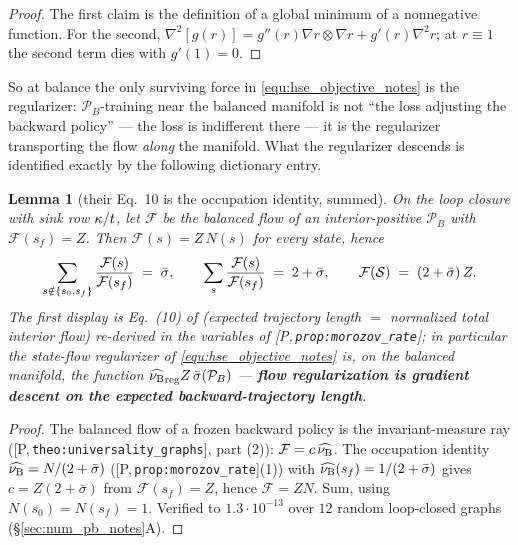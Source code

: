 \documentclass[11pt]{article}
\newtheorem{lemma}[theorem]{Lemma}
\theoremstyle{definition}
\theoremstyle{remark}
\def\lambda{\widehat\nuB}
\newcommand{\paperref}[1]{[P,\,\texttt{#1}]}   %
\begin{document}
\begin{proof}
The first claim is the definition of a global minimum of a nonnegative function. For the
second, $\nabla^2[g(r)] = g''(r)\nabla r\otimes\nabla r + g'(r)\nabla^2 r$; at $r\equiv1$
the second term dies with $g'(1)=0$.
\end{proof}

So at balance the only surviving force in \eqref{equ:hse_objective_notes} is the regularizer:
$\mathcal P_B$-training near the balanced manifold is not ``the loss adjusting the
backward policy'' --- the loss is indifferent there --- it is the regularizer
transporting the flow \emph{along} the manifold. What the regularizer descends is
identified exactly by the following dictionary entry.

\begin{lemma}[their Eq.~10 is the occupation identity, summed]\label{lem:eq10_occupation_notes}
On the loop closure with sink row $\kappa/t$, let $\mathcal F$ be the balanced flow of an
interior-positive $\mathcal P_B$ with $\mathcal F(s_f)=Z$. Then $\mathcal F(s) = Z\,N(s)$
for every state, hence
\begin{equation}\label{equ:eq10_notes}
    \sum_{s\notin\{s_0,s_f\}}\frac{\mathcal F(s)}{\mathcal F(s_f)} \;=\; \bar\sigma,
    \qquad
    \sum_{s}\frac{\mathcal F(s)}{\mathcal F(s_f)} \;=\; 2+\bar\sigma,
    \qquad
    \mathcal F(\mathcal S) \;=\; (2+\bar\sigma)\,Z .
\end{equation}
The first display is Eq.~(10) of \citet{morozov2025revisiting} (expected trajectory
length $=$ normalized total interior flow) re-derived in the variables of
\paperref{prop:morozov\_rate}; in particular the state-flow regularizer of
\eqref{equ:hse_objective_notes} is, on the balanced manifold, the function
$\lamreg{}Z\,\bar\sigma(\mathcal P_B)$ --- \textbf{flow regularization is
gradient descent on the expected backward-trajectory length}.
\end{lemma}

\begin{proof}
The balanced flow of a frozen backward policy is the invariant-measure ray
(\paperref{theo:universality\_graphs}, part (2)): $\mathcal F = c\,\lambda$. The occupation
identity $\lambda = N/(2+\bar\sigma)$ (\paperref{prop:morozov\_rate}(1)) with
$\lambda(s_f)=1/(2+\bar\sigma)$ gives $c = Z(2+\bar\sigma)$ from $\mathcal F(s_f)=Z$,
hence $\mathcal F = Z N$. Sum, using $N(s_0)=N(s_f)=1$. Verified to $1.3\cdot10^{-13}$
over $12$ random loop-closed graphs (\S\ref{sec:num_pb_notes}A).
\end{proof}
\end{document}
